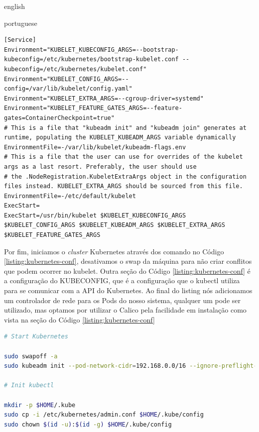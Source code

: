 \begin{otherlanguage*}{english}
\begin{otherlanguage*}{portuguese}
\begin{lstlisting}[language=plaintext,caption={Configuração do kubelet para executar no systemd com Feature Flag de ContainerCheckpoint e cgroup do systemd.},label={listing:kubelet-conf}]
[Service]
Environment="KUBELET_KUBECONFIG_ARGS=--bootstrap-kubeconfig=/etc/kubernetes/bootstrap-kubelet.conf --kubeconfig=/etc/kubernetes/kubelet.conf"
Environment="KUBELET_CONFIG_ARGS=--config=/var/lib/kubelet/config.yaml"
Environment="KUBELET_EXTRA_ARGS=--cgroup-driver=systemd"
Environment="KUBELET_FEATURE_GATES_ARGS=--feature-gates=ContainerCheckpoint=true"
# This is a file that "kubeadm init" and "kubeadm join" generates at runtime, populating the KUBELET_KUBEADM_ARGS variable dynamically
EnvironmentFile=-/var/lib/kubelet/kubeadm-flags.env
# This is a file that the user can use for overrides of the kubelet args as a last resort. Preferably, the user should use
# the .NodeRegistration.KubeletExtraArgs object in the configuration files instead. KUBELET_EXTRA_ARGS should be sourced from this file.
EnvironmentFile=-/etc/default/kubelet
ExecStart=
ExecStart=/usr/bin/kubelet $KUBELET_KUBECONFIG_ARGS $KUBELET_CONFIG_ARGS $KUBELET_KUBEADM_ARGS $KUBELET_EXTRA_ARGS $KUBELET_FEATURE_GATES_ARGS
\end{lstlisting}

Por fim, iniciamos o \textit{cluster} Kubernetes através dos comando no Código
\ref{listing:kubernetes-conf}, desativamos o swap da máquina para não criar conflitos que podem
ocorrer no kubelet. Outra seção do Código \ref{listing:kubernetes-conf} é a configuração do
KUBECONFIG, que é a configuração que o kubectl utiliza para se comunicar com a API do Kubernetes.
Ao final do listing nós adicionamos um controlador de rede para os Pods do nosso sistema, qualquer
um pode ser utilizado, mas optamos por utilizar o Calico \cite{calico} pela facilidade em
instalação como vista na seção do Código \ref{listing:kubernetes-conf}

\begin{lstlisting}[language=bash,caption={Inicialização do Kubernetes, configuração de acesso para o kubectl e instalação do administrador de rede para Pods Calico.},label={listing:kubernetes-conf}]
# Start Kubernetes

sudo swapoff -a
sudo kubeadm init --pod-network-cidr=192.168.0.0/16 --ignore-preflight-errors='all'

# Init kubectl

mkdir -p $HOME/.kube
sudo cp -i /etc/kubernetes/admin.conf $HOME/.kube/config
sudo chown $(id -u):$(id -g) $HOME/.kube/config


\end{lstlisting}
\end{otherlanguage*}
\end{otherlanguage*}
